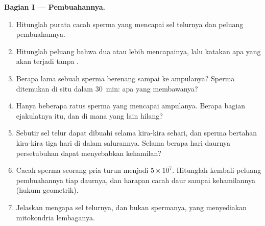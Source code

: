 \begin{problem}
\medskip
\noindent\textbf{Bagian I --- Pembuahannya.}
\begin{enumerate}
  \item Hitunglah purata cacah sperma yang mencapai sel telurnya dan
        peluang pembuahannya.
  \item Hitunglah peluang bahwa dua atau lebih mencapainya, lalu
        katakan apa yang akan terjadi tanpa .
  \item Berapa lama sebuah sperma berenang sampai ke ampulanya? Sperma
        ditemukan di situ dalam \qty{30}{min}: apa yang membawanya?
  \item Hanya beberapa ratus sperma yang mencapai ampulanya. Berapa
        bagian ejakulatnya itu, dan di mana yang lain hilang?
  \item Sebutir sel telur dapat dibuahi selama kira-kira sehari, dan
        sperma bertahan kira-kira tiga hari di dalam salurannya. Selama
        berapa hari daurnya persetubuhan dapat menyebabkan kehamilan?
  \item Cacah sperma seorang pria turun menjadi $5\times 10^{7}$.
        Hitunglah kembali peluang pembuahannya tiap daurnya, dan
        harapan cacah daur sampai kehamilannya (hukum geometrik).
  \item Jelaskan mengapa sel telurnya, dan bukan spermanya, yang
        menyediakan mitokondria lembaganya.
\end{enumerate}


\end{problem}
